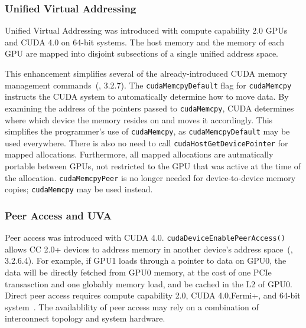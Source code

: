 \subsubsection{Unified Virtual Addressing}
\label{sec:uva}

Unified Virtual Addressing was introduced with compute capability 2.0 GPUs and CUDA 4.0 on 64-bit systems.
The host memory and the memory of each GPU are mapped into disjoint subsections of a single unified address space.

This enhancement simplifies several of the already-introduced CUDA memory management commands~(\cite{nvidia2011cudac40}, 3.2.7).
The \texttt{cudaMemcpyDefault} flag for \texttt{cudaMemcpy} instructs the CUDA system to automatically determine how to move data.
By examining the address of the pointers passed to \texttt{cudaMemcpy}, CUDA determines where which device the memory resides on and moves it accordingly.
This simplifies the programmer's use of \texttt{cudaMemcpy}, as \texttt{cudaMemcpyDefault} may be used everywhere.
There is also no need to call \texttt{cudaHostGetDevicePointer} for mapped allocations.
Furthermore, all mapped allocations are autmatically portable between GPUs, not restricted to the GPU that was active at the time of the allocation.
\texttt{cudaMemcpyPeer} is no longer needed for device-to-device memory copies; \texttt{cudaMemcpy} may be used instead.

\subsubsection{Peer Access and UVA}
\label{sec:cuda-peer}

Peer access was introduced with CUDA 4.0.
\texttt{cudaDeviceEnablePeerAccess()} allows CC 2.0+ devices to address memory in another device's address space~(\cite{nvidia2011cudac40}, 3.2.6.4).
For example, if GPU1 loads through a pointer to data on GPU0, the data will be directly fetched from GPU0 memory, at the cost of one PCIe transasction and one globably memory load, and be cached in the L2 of GPU0.
Direct peer access requires compute capability 2.0, CUDA 4.0,Fermi+, and 64-bit system~\cite{schroeder2011peer}.
The availablility of peer access may rely on a combination of interconnect topology and system hardware.


